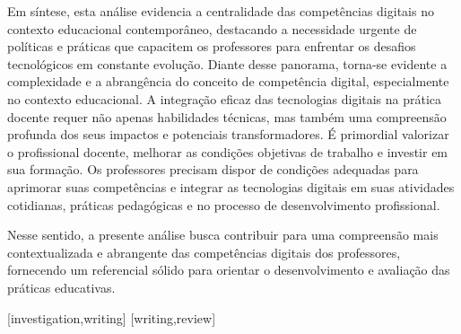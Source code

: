 \documentclass[portuguese]{textolivre}
\begin{document}
Em síntese, esta análise evidencia a centralidade das competências
digitais no contexto educacional contemporâneo, destacando a necessidade
urgente de políticas e práticas que capacitem os professores para
enfrentar os desafios tecnológicos em constante evolução. Diante desse
panorama, torna-se evidente a complexidade e a abrangência do conceito
de competência digital, especialmente no contexto educacional. A
integração eficaz das tecnologias digitais na prática docente requer não
apenas habilidades técnicas, mas também uma compreensão profunda dos
seus impactos e potenciais transformadores. É primordial valorizar o
profissional docente, melhorar as condições objetivas de trabalho e
investir em sua formação. Os professores precisam dispor de condições
adequadas para aprimorar suas competências e integrar as tecnologias
digitais em suas atividades cotidianas, práticas pedagógicas e no
processo de desenvolvimento profissional.

Nesse sentido, a presente análise busca contribuir para uma compreensão
mais contextualizada e abrangente das competências digitais dos
professores, fornecendo um referencial sólido para orientar o
desenvolvimento e avaliação das práticas educativas.

\printbibliography\label{sec-bib}
\begin{contributors}
[investigation,writing]
[writing,review]
\end{contributors}
\end{document}

